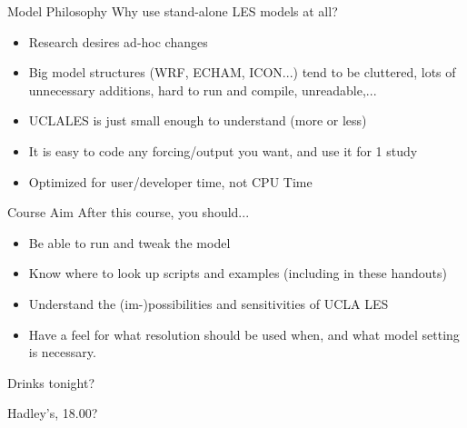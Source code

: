 \begin{frame}{Model Philosophy}
Why use stand-alone LES models at all?
\begin{itemize}
 \item Research desires ad-hoc changes
 \item Big model structures (WRF, ECHAM, ICON...) tend to be cluttered, lots of unnecessary additions, hard to run and compile, unreadable,...
 \item UCLALES is just small enough to understand (more or less)
 \item It is easy to code any forcing/output you want, and use it for 1 study
 \item Optimized for user/developer time, not CPU Time
\end{itemize}
 \end{frame}
\begin{frame}{Course Aim}
 After this course, you should...
\begin{itemize}
 \item Be able to run and tweak the model
 \item Know where to look up scripts and examples (including in these handouts)
 \item Understand the (im-)possibilities and sensitivities of UCLA LES
 \item Have a feel for what resolution should be used when, and what model setting is necessary.
\end{itemize}

\end{frame}
\begin{frame}{Drinks tonight?}
\begin{center}
\huge{Hadley's, 18.00?} \end{center}
\end{frame}
